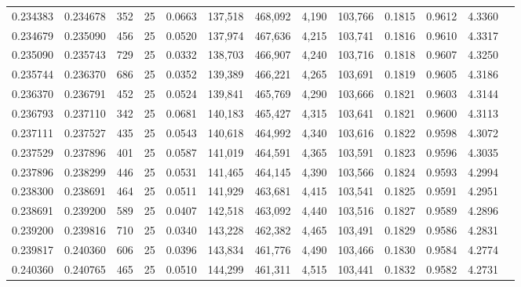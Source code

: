 \begin{tabular}{rrrrrrrrrrrrr}
0.234383 & 0.234678 &   352 &  25 &                                     0.0663 & 137,518 & 468,092 &   4,190 & 103,766 & 0.1815 & 0.9612 & 4.3360 \\
0.234679 & 0.235090 &   456 &  25 &                                     0.0520 & 137,974 & 467,636 &   4,215 & 103,741 & 0.1816 & 0.9610 & 4.3317 \\
0.235090 & 0.235743 &   729 &  25 &                                     0.0332 & 138,703 & 466,907 &   4,240 & 103,716 & 0.1818 & 0.9607 & 4.3250 \\
0.235744 & 0.236370 &   686 &  25 &                                     0.0352 & 139,389 & 466,221 &   4,265 & 103,691 & 0.1819 & 0.9605 & 4.3186 \\
0.236370 & 0.236791 &   452 &  25 &                                     0.0524 & 139,841 & 465,769 &   4,290 & 103,666 & 0.1821 & 0.9603 & 4.3144 \\
0.236793 & 0.237110 &   342 &  25 &                                     0.0681 & 140,183 & 465,427 &   4,315 & 103,641 & 0.1821 & 0.9600 & 4.3113 \\
0.237111 & 0.237527 &   435 &  25 &                                     0.0543 & 140,618 & 464,992 &   4,340 & 103,616 & 0.1822 & 0.9598 & 4.3072 \\
0.237529 & 0.237896 &   401 &  25 &                                     0.0587 & 141,019 & 464,591 &   4,365 & 103,591 & 0.1823 & 0.9596 & 4.3035 \\
0.237896 & 0.238299 &   446 &  25 &                                     0.0531 & 141,465 & 464,145 &   4,390 & 103,566 & 0.1824 & 0.9593 & 4.2994 \\
0.238300 & 0.238691 &   464 &  25 &                                     0.0511 & 141,929 & 463,681 &   4,415 & 103,541 & 0.1825 & 0.9591 & 4.2951 \\
0.238691 & 0.239200 &   589 &  25 &                                     0.0407 & 142,518 & 463,092 &   4,440 & 103,516 & 0.1827 & 0.9589 & 4.2896 \\
0.239200 & 0.239816 &   710 &  25 &                                     0.0340 & 143,228 & 462,382 &   4,465 & 103,491 & 0.1829 & 0.9586 & 4.2831 \\
0.239817 & 0.240360 &   606 &  25 &                                     0.0396 & 143,834 & 461,776 &   4,490 & 103,466 & 0.1830 & 0.9584 & 4.2774 \\
0.240360 & 0.240765 &   465 &  25 &                                     0.0510 & 144,299 & 461,311 &   4,515 & 103,441 & 0.1832 & 0.9582 & 4.2731 \\

\end{tabular}
